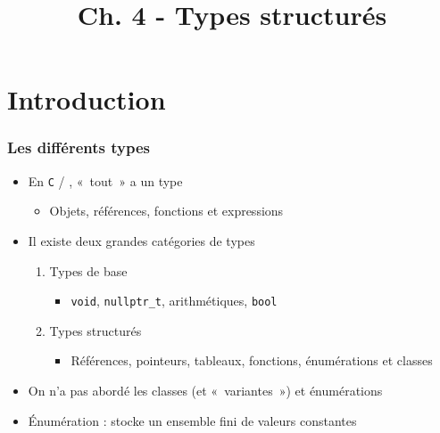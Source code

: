 


\title{Ch. 4 - Types structurés}




\section{Introduction}

\begin{frame}
\frametitle{Les différents types}
\begin{itemize}[<+->]
\item En \texttt{C} / \cpp, «~tout~» a un type
	\begin{itemize}
	\item Objets, références, fonctions et expressions
	\end{itemize}
\item Il existe deux grandes catégories de types
	\begin{enumerate}
	\item Types de base
		\begin{itemize}
		\item \lstinline|void|, \lstinline|nullptr_t|, arithmétiques, \lstinline|bool|
		\end{itemize}
	\item Types structurés
		\begin{itemize}
		\item Références, pointeurs, tableaux, fonctions, énumérations et classes
		\end{itemize}
	\end{enumerate}
\item On n'a pas abordé les classes (et «~variantes~») et énumérations
\item Énumération : stocke un ensemble fini de valeurs constantes
\end{itemize}
\end{frame}

